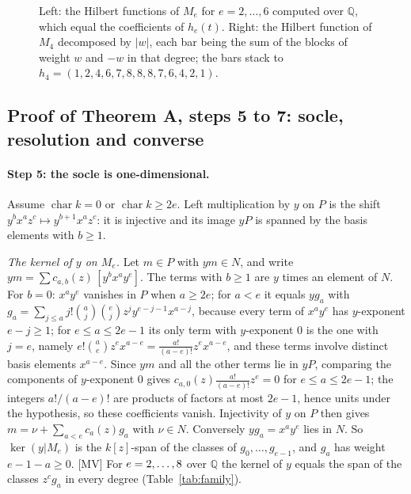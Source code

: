 \documentclass[11pt]{article}
\theoremstyle{definition}
\theoremstyle{remark}
\newcommand{\Q}{\mathbb{Q}}
\newcommand{\ch}{\operatorname{char}}
\begin{document}
\begin{figure}[htbp]
\centering

\caption{Left: the Hilbert functions of $M_e$ for $e=2,\dots,6$ computed over $\Q$, which equal the coefficients of $h_e(t)$. Right: the Hilbert function of $M_4$ decomposed by $|w|$, each bar being the sum of the blocks of weight $w$ and $-w$ in that degree; the bars stack to $h_4=(1,2,4,6,7,8,8,8,7,6,4,2,1)$.}
\label{fig:hilbert}
\end{figure}

\begin{table}[htbp]
\centering\footnotesize

\caption{Exact check of the proof of Theorem A for $e=2,\dots,8$: the number of weight blocks $(w,n)$ whose dimension was computed from the unscaled matrix of equation~\eqref{eq:dimblock} over $\Q$ and equal to $D_q$; the primes up to $31$ at which all blocks keep the closed form (exactly those with $p\ge2e$); and the primes at which the piece of weight $0$ in degree $4e-2$ is nonzero (exactly those with $p<2e$).}
\label{tab:blocks}
\end{table}

\subsection{Proof of Theorem A, steps 5 to 7: socle, resolution and converse}
\label{sec:proofA2}

\paragraph{Step 5: the socle is one-dimensional.} Assume $\ch k=0$ or $\ch k\ge2e$. Left multiplication by $y$ on $P$ is the shift $y^bx^az^c\mapsto y^{b+1}x^az^c$: it is injective and its image $yP$ is spanned by the basis elements with $b\ge1$.

\emph{The kernel of $y$ on $M_e$.} Let $m\in P$ with $ym\in N$, and write $ym=\sum c_{a,b}(z)\,[y^bx^ay^e]$. The terms with $b\ge1$ are $y$ times an element of $N$. For $b=0$: $x^ay^e$ vanishes in $P$ when $a\ge2e$; for $a<e$ it equals $yg_a$ with $g_a=\sum_{j\le a}j!\binom aj\binom ej z^jy^{e-j-1}x^{a-j}$, because every term of $x^ay^e$ has $y$-exponent $e-j\ge1$; for $e\le a\le2e-1$ its only term with $y$-exponent $0$ is the one with $j=e$, namely $e!\binom ae z^ex^{a-e}=\frac{a!}{(a-e)!}z^ex^{a-e}$, and these terms involve distinct basis elements $x^{a-e}$. Since $ym$ and all the other terms lie in $yP$, comparing the components of $y$-exponent $0$ gives $c_{a,0}(z)\frac{a!}{(a-e)!}z^e=0$ for $e\le a\le2e-1$; the integers $a!/(a-e)!$ are products of factors at most $2e-1$, hence units under the hypothesis, so these coefficients vanish. Injectivity of $y$ on $P$ then gives $m=\nu+\sum_{a<e}c_a(z)g_a$ with $\nu\in N$. Conversely $yg_a=x^ay^e$ lies in $N$. So $\ker(y|M_e)$ is the $k[z]$-span of the classes of $g_0,\dots,g_{e-1}$, and $g_a$ has weight $e-1-a\ge0$. [MV] For $e=2,\dots,8$ over $\Q$ the kernel of $y$ equals the span of the classes $z^cg_a$ in every degree (Table~\ref{tab:family}).
\end{document}
